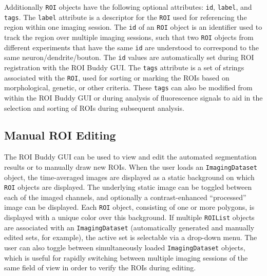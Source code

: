 Additionally \verb|ROI| objects have the following
optional attributes: \verb|id|, \verb|label|, and \verb|tags|.
The \verb|label| attribute is a descriptor for the \verb|ROI| used for
referencing the region within one imaging session.
The \verb|id| of an \verb|ROI| object is an identifier used to track the region over
multiple imaging sessions, such that two \verb|ROI| objects from different experiments
that have the same \verb|id| are understood to correspond to the same neuron/dendrite/bouton.
The \verb|id| values are automatically set during ROI registration with the ROI Buddy GUI.
The \verb|tags| attribute is a set of strings associated with the \verb|ROI|, used for
sorting or marking the ROIs based on morphological, genetic, or other criteria.
These \verb|tags| can also be modified from within the ROI Buddy GUI or during analysis of fluorescence signals
to aid in the selection and sorting of ROIs during subsequent analysis.


\subsection{Manual ROI Editing}\label{sec:sima:ROIbuddy}
The ROI Buddy GUI can be used to view and edit the automated segmentation results
or to manually draw new ROIs.
When the user loads an \verb|ImagingDataset| object, the time-averaged images are displayed as a static background on which \verb|ROI|
objects are displayed.
The underlying static image can be toggled between each of the imaged channels,
and optionally a contrast-enhanced ``processed'' image can be displayed.
Each \verb|ROI| object, consisting of one or more polygons, is displayed with a unique color over this background.
If multiple \verb|ROIList| objects are associated with an \verb|ImagingDataset| 
(automatically generated and manually edited sets, for example), 
the active set is selectable via a drop-down menu.
The user can also toggle between simultaneously loaded \verb|ImagingDataset| objects, 
which is useful for rapidly switching between multiple imaging sessions of the same field of view
in order to verify the ROIs during editing.


